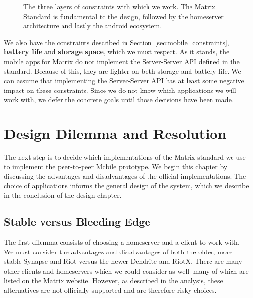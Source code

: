 \begin{figure}
	\centering
	\resizebox{!}{!}{}
	\caption{%
		The three layers of constraints with which we work.
		The Matrix Standard is fundamental to the design, followed by the homeserver architecture and lastly the android ecosystem.
	}%
	\label{fig:design_constraints}
\end{figure}

We also have the constraints described in Section~\ref{sec:mobile_constraints}, \textbf{battery life} and \textbf{storage space}, which we must respect.
As it stands, the mobile apps for Matrix do not implement the Server-Server \ac{API} defined in the standard.
Because of this, they are lighter on both storage and battery life.
We can assume that implementing the Server-Server \ac{API} has at least some negative impact on these constraints.
Since we do not know which applications we will work with, we defer the concrete goals until those decisions have been made.

\chapter{Design Dilemma and Resolution}\label{chp:design_dilemma}
The next step is to decide which implementations of the Matrix standard we use to implement the peer-to-peer Mobile prototype.
We begin this chapter by discussing the advantages and disadvantages of the official implementations.
The choice of applications informs the general design of the system, which we describe in the conclusion of the design chapter.

\section{Stable versus Bleeding Edge}
The first dilemma consists of choosing a homeserver and a client to work with.
We must consider the advantages and disadvantages of both the older, more stable Synapse and Riot versus the newer Dendrite and RiotX.
There are many other clients and homeservers which we could consider as well, many of which are listed on the Matrix website.
However, as described in the analysis, these alternatives are not officially supported and are therefore risky choices.

